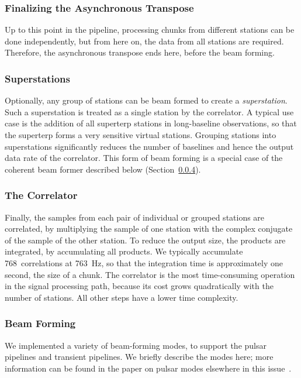 \subsubsection{Finalizing the Asynchronous Transpose}

Up to this point in the pipeline, processing chunks from different stations
can be done independently, but from here on, the data from all stations are
required.
Therefore, the asynchronous transpose ends here, before the beam forming.


\subsubsection{Superstations}

Optionally, any group of stations can be beam formed to create a
\emph{superstation}.
Such a superstation is treated as a single station by the correlator.
A typical use case is the addition of all superterp stations in long-baseline
observations, so that the superterp forms a very sensitive virtual stations.
Grouping stations into superstations significantly reduces the number of
baselines and hence the output data rate of the correlator.
This form of beam forming is a special case of the coherent beam former
described below (Section~\ref{sec:beam-forming}).


\subsubsection{The Correlator}

Finally, the samples from each pair of individual or grouped stations are
correlated, by multiplying the sample of one station with the complex conjugate
of the sample of the other station.
To reduce the output size, the products are integrated, by accumulating all
products.
We typically accumulate 768~correlations at 763~Hz, so that the integration
time is approximately one second, the size of a chunk.
The correlator is the most time-consuming operation in the signal
processing path, because its cost grows quadratically with the number of
stations.
All other steps have a lower time complexity.


\subsubsection{Beam Forming}
\label{sec:beam-forming}

We implemented a variety of beam-forming modes, to support the pulsar pipelines
and transient pipelines.
We briefly describe the modes here; more information can be found in the
paper on pulsar modes elsewhere in this issue~\cite{Hessels:10}.

